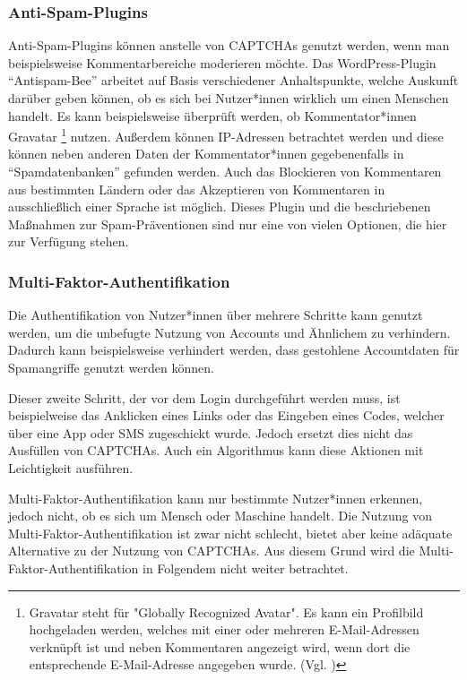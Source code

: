 \subsubsection*{Anti-Spam-Plugins}
Anti-Spam-Plugins können anstelle von CAPTCHAs genutzt werden, wenn man beispielsweise Kommentar\-bereiche moderieren möchte.
Das WordPress-Plugin ``Antispam-Bee'' arbeitet auf Basis verschiedener Anhaltspunkte, 
welche Auskunft darüber geben können, ob es sich bei Nutzer*innen wirklich um einen Menschen handelt.
Es kann beispielsweise überprüft werden, ob Kommentator*innen Gravatar
\footnote[3]{Gravatar steht für "Globally Recognized Avatar". 
Es kann ein Profilbild hochgeladen werden, welches mit einer oder mehreren E-Mail-Adressen verknüpft ist 
und neben Kommentaren angezeigt wird, wenn dort die entsprechende E-Mail-Adresse angegeben wurde. (Vgl. \cite{doku:antispambee})} nutzen.
Außerdem können IP-Adressen betrachtet werden und diese können neben anderen Daten der Kommentator*innen gegebenenfalls in ``Spamdatenbanken'' gefunden werden.
Auch das Blockieren von Kommentaren aus bestimmten Ländern oder das Akzeptieren von Kommentaren in ausschließlich einer Sprache ist möglich.
Dieses Plugin und die beschriebenen Maßnahmen zur Spam-Präventionen sind nur eine von vielen Optionen, die hier zur Verfügung stehen.
\cite{blog:antispambee}
\cite{doku:antispambee}

\subsubsection*{Multi-Faktor-Authentifikation}
Die Authentifikation von Nutzer*innen über mehrere Schritte kann genutzt werden, um die unbefugte Nutzung von Accounts und Ähnlichem zu verhindern.
Dadurch kann beispielsweise verhindert werden, dass gestohlene Accountdaten für Spamangriffe genutzt werden können.

Dieser zweite Schritt, der vor dem Login durchgeführt werden muss, ist beispielweise das Anklicken eines Links oder das Eingeben eines Codes,
welcher über eine App oder SMS zugeschickt wurde.
Jedoch ersetzt dies nicht das Ausfüllen von CAPTCHAs.
Auch ein Algorithmus kann diese Aktionen mit Leichtigkeit ausführen. 

Multi-Faktor-Authentifikation kann nur bestimmte Nutzer*innen erkennen, jedoch nicht, ob es sich um Mensch oder Maschine handelt.
Die Nutzung von Multi-Faktor-Authentifikation ist zwar nicht schlecht,
bietet aber keine adäquate Alternative zu der Nutzung von CAPTCHAs. 
Aus diesem Grund wird die Multi-Faktor-Authentifi\-kation in Folgendem nicht weiter betrachtet.

